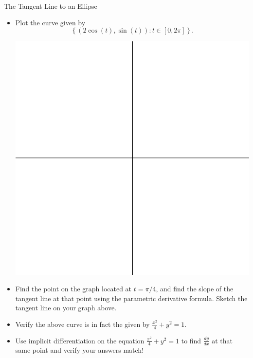 \begin{exercise}{The Tangent Line to an Ellipse \Coffeecup \Coffeecup}

\begin{itemize}
\item Plot the  curve given by $$\left\{\left(2\cos(t),\sin(t)\right): t\in [0,2\pi] \right\}.$$ 

\begin{center}
\includegraphics[scale=0.8]{quadall}
\end{center}

\item Find the point on the graph located at $t=\pi/4$, and find the slope of the tangent line at that point using the parametric derivative formula.  Sketch the tangent line on your graph above.

\vspace*{1in}

\item Verify the above curve is in fact the  given by $\frac{x^2}{4}+y^2=1$.

\vspace*{1in}

\item Use implicit differentiation on the equation $\frac{x^2}{4}+y^2=1$ to find $\frac{dy}{dx}$ at that same point and verify your answers match!
\vspace*{1in}
\end{itemize}
\end{exercise}

